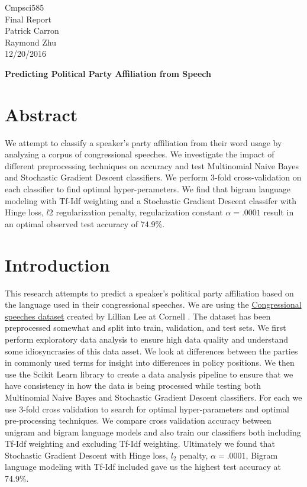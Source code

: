 \documentclass[a4paper, 12pt]{article}
\begin{document}
\noindent
Cmpsci585\\
Final Report\\
Patrick Carron \\
Raymond Zhu\\
12/20/2016 \\
\begin{center}

\textbf{Predicting Political Party Affiliation from Speech}
\end{center}

\section{Abstract}
We attempt to classify a speaker's party affiliation from their word usage by analyzing a corpus of congressional speeches.  We investigate the impact of different preprocessing techniques on accuracy and test Multinomial Naive Bayes and Stochastic Gradient Descent classifiers. We perform 3-fold cross-validation on each classifier to find optimal hyper-perameters. We find that bigram language modeling with Tf-Idf weighting and a Stochastic Gradient Descent classifer with Hinge loss, $l2$ regularization penalty, regularization constant $\alpha=.0001$ result in an optimal observed test accuracy of 74.9\%.
	
	\section{Introduction}
	
	This research attempts to predict a speaker's political party affiliation based on the language used in their congressional speeches. We are using the \href{http://www.cs.cornell.edu/home/llee/data/convote.html}{Congressional speeches dataset} created by Lillian Lee at Cornell \cite{thomas2006get}. The dataset has been preprocessed somewhat and split into train, validation, and test sets.  We first perform exploratory data analysis to ensure high data quality and understand some idiosyncrasies of this data asset. We look at differences between the parties in commonly used terms for insight into differences in policy positions. We then use the \cite{pedregosa2011scikit} Scikit Learn library to create a data analysis pipeline to ensure that we have consistency in how the data is being processed while testing both Multinomial Naive Bayes and Stochastic Gradient Descent classifiers.  For each we use 3-fold cross validation to search for optimal hyper-parameters and optimal pre-processing techniques.  We compare cross validation accuracy between unigram and bigram language models and also train our classifiers both including Tf-Idf weighting and excluding Tf-Idf weighting. Ultimately we found that Stochastic Gradient Descent with Hinge loss, $l_2$ penalty, $\alpha=.0001$,  Bigram language modeling with Tf-Idf included gave us the highest test accuracy at 74.9\%.
	
\end{document}
